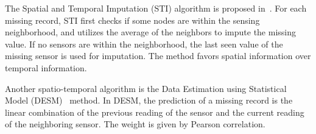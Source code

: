 The Spatial and Temporal Imputation (STI) algorithm is proposed in~\cite{li2008spatial}. 
For each missing record, STI first checks if some nodes are within the sensing neighborhood, and utilizes
the average of the neighbors to impute the missing value. If no sensors are within the neighborhood, the last seen value of the 
missing sensor is used for imputation. The method favors spatial information over temporal information.

Another spatio-temporal algorithm is the Data Estimation using Statistical Model (DESM)~\cite{li2008data} method.  
In DESM, the prediction of a missing record is the linear combination of the previous reading of the sensor and the current reading of the neighboring sensor. The weight is given by Pearson correlation.


